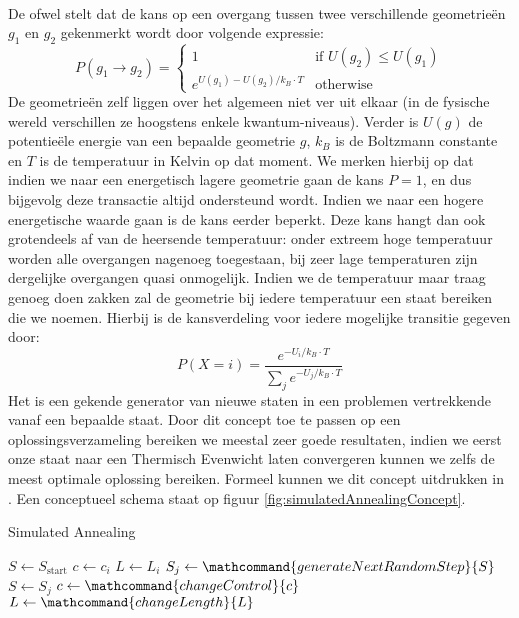\paragraph{}De  ofwel  stelt dat de kans op een overgang tussen twee verschillende geometrie\"en $g_1$ en $g_2$ gekenmerkt wordt door volgende expressie:
\begin{equation}
P\left(g_1\rightarrow g_2\right)=\left\{\begin{array}{ll}
1&\mbox{if } U\left(g_2\right)\leq U\left(g_1\right)\\
e^{U\left(g_1\right)-U\left(g_2\right)/k_B\cdot T}&\mbox{otherwise}
\end{array}\right.
\end{equation}
De geometrie\"en zelf liggen over het algemeen niet ver uit elkaar (in de fysische wereld verschillen ze hoogstens enkele kwantum-niveaus). Verder is $U\left(g\right)$ de potentie\"ele energie van een bepaalde geometrie $g$, $k_B$ is de Boltzmann constante en $T$ is de temperatuur in Kelvin op dat moment. We merken hierbij op dat indien we naar een energetisch lagere geometrie gaan de kans $P=1$, en dus bijgevolg deze transactie altijd ondersteund wordt. Indien we naar een hogere energetische waarde gaan is de kans eerder beperkt. Deze kans hangt dan ook grotendeels af van de heersende temperatuur: onder extreem hoge temperatuur worden alle overgangen nagenoeg toegestaan, bij zeer lage temperaturen zijn dergelijke overgangen quasi onmogelijk. Indien we de temperatuur maar traag genoeg doen zakken zal de geometrie bij iedere temperatuur een staat bereiken die we  noemen. Hierbij is de kansverdeling voor iedere mogelijke transitie gegeven door:
\begin{equation}
P\left(X=i\right)=\displaystyle\frac{e^{-U_i/k_B\cdot T}}{\sum_j e^{-U_j/k_B\cdot T}}
\end{equation}
Het  is een gekende generator van nieuwe staten in een problemen vertrekkende vanaf een bepaalde staat. Door dit concept toe te passen op een oplossingsverzameling bereiken we meestal zeer goede resultaten, indien we eerst onze staat naar een Thermisch Evenwicht laten convergeren kunnen we zelfs de meest optimale oplossing bereiken. Formeel kunnen we dit concept uitdrukken in . Een conceptueel schema staat op figuur \ref{fig:simulatedAnnealingConcept}.
\begin{algorithm}[htb]
\caption{Simulated Annealing}
\label{alg:simulatedAnnealing}
\begin{algorithmic}[1]
\STATE $S\leftarrow S_{\mbox{start}}$
\STATE $c\leftarrow c_i$
\STATE $L\leftarrow L_i$
\STATE $S_j\leftarrow\mathcommand{generateNextRandomStep}{S}$
\STATE $S\leftarrow S_j$
\ENDIF
\ENDFOR
\STATE $c\leftarrow\mathcommand{changeControl}{c}$
\STATE $L\leftarrow\mathcommand{changeLength}{L}$
\ENDWHILE
\end{algorithmic}
\end{algorithm}
